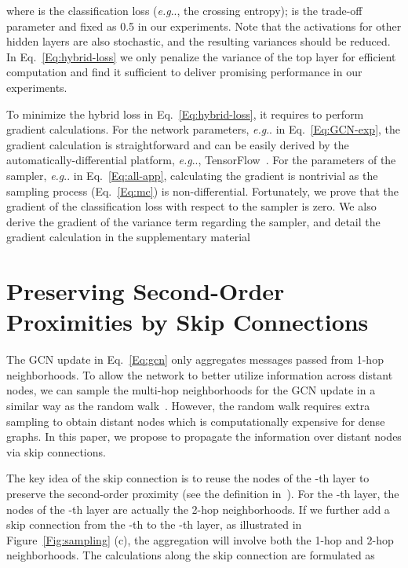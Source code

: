 \documentclass{article}
\makeatletter
\DeclareRobustCommand\onedot{\futurelet\@let@token\@onedot}
\def\@onedot{\ifx\@let@token.\else.\null\fi\xspace}
\def\eg{\emph{e.g}\onedot} \def\Eg{\emph{E.g}\onedot}
\makeatother
\begin{document}
\vskip -0.1in
where  is the classification loss (\eg, the crossing entropy);
 is the trade-off parameter and fixed as 0.5 in our experiments. Note that the activations for other hidden layers are also stochastic, and the resulting variances should be reduced. In Eq.~\eqref{Eq:hybrid-loss} we only penalize the variance of the top layer for efficient computation and find it sufficient to deliver promising performance in our experiments.

To minimize the hybrid loss in Eq.~\eqref{Eq:hybrid-loss}, it requires to perform gradient calculations.
For the network parameters, \eg  in Eq.~\eqref{Eq:GCN-exp}, the gradient calculation is straightforward and can be easily derived by the automatically-differential platform, \eg, TensorFlow~\cite{abadi2016tensorflow}. For the parameters of the sampler, \eg  in Eq.~\eqref{Eq:all-app}, calculating the gradient is nontrivial as the sampling process (Eq.~\eqref{Eq:mc}) is non-differential.
Fortunately, we prove that the gradient of the classification loss with respect to the sampler is zero. We also derive the gradient of the variance term regarding the sampler, and detail the gradient calculation in the supplementary material























\section{Preserving Second-Order Proximities by Skip Connections}

The GCN update in Eq.~\eqref{Eq:gcn} only aggregates messages passed from 1-hop neighborhoods. To allow the network to better utilize information across distant nodes, we can sample the multi-hop neighborhoods for the GCN update in a similar way as the random walk~\cite{perozzi2014deepwalk,such2017robust}. However, the random walk requires extra sampling to obtain distant nodes which is computationally expensive for dense graphs. In this paper, we propose to propagate the information over distant nodes via skip connections.

The key idea of the skip connection is to reuse the nodes of the -th layer to preserve the second-order proximity (see the definition in~\cite{tang2015line}). For the -th layer, the nodes of the -th layer are actually the 2-hop neighborhoods. If we further add a skip connection from the -th to the -th layer, as illustrated in Figure~\ref{Fig:sampling} (c), the aggregation will involve both the 1-hop and 2-hop neighborhoods. The calculations along the skip connection are formulated as
\vskip -0.2in
\end{document}
